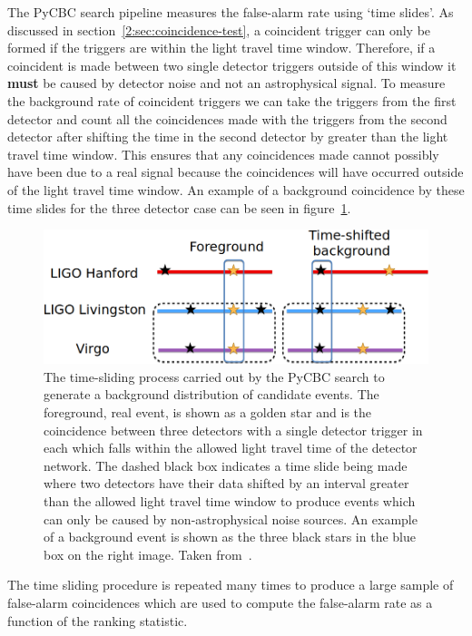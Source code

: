 The PyCBC search pipeline measures the false-alarm rate using `time slides'. As discussed in section~\ref{2:sec:coincidence-test}, a coincident trigger can only be formed if the triggers are within the light travel time window. Therefore, if a coincident is made between two single detector triggers outside of this window it \textbf{must} be caused by detector noise and not an astrophysical signal. To measure the background rate of coincident triggers we can take the triggers from the first detector and count all the coincidences made with the triggers from the second detector after shifting the time in the second detector by greater than the light travel time window. This ensures that any coincidences made cannot possibly have been due to a real signal because the coincidences will have occurred outside of the light travel time window. An example of a background coincidence by these time slides for the three detector case can be seen in figure~\ref{2:fig:timeslides}.
%
\begin{figure}
    \centering
    \includegraphics[width=0.9\linewidth]{images/2_searches/TimeslideExample.png}
    \caption{The time-sliding process carried out by the PyCBC search to generate a background distribution of candidate events. The foreground, real \gwadj event, is shown as a golden star and is the coincidence between three detectors with a single detector trigger in each which falls within the allowed light travel time of the detector network. The dashed black box indicates a time slide being made where two detectors have their data shifted by an interval greater than the allowed light travel time window to produce events which can only be caused by non-astrophysical noise sources. An example of a background event is shown as the three black stars in the blue box on the right image. Taken from~\cite{PyCBC_global:2020}.}
    \label{2:fig:timeslides}
\end{figure}
%

The time sliding procedure is repeated many times to produce a large sample of false-alarm coincidences which are used to compute the false-alarm rate as a function of the ranking statistic.

